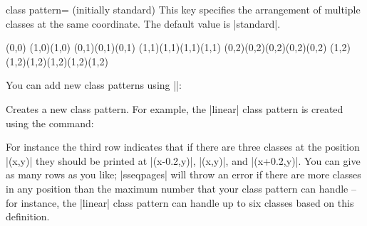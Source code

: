 \documentclass{ltxdoc}
\begin{document}
\begin{sseqdata}[name=ex1,degree={#1}{1-#1}]
\begin{key}{class pattern= (initially standard)}
This key specifies the arrangement of multiple classes at the same coordinate. The default value is |standard|.
\begin{codeexample}[]
\begin{sseqdata}[name=class pattern example,no axes,ymirror]
\class(0,0)
\class(1,0)\class(1,0)
\class(0,1)\class(0,1)\class(0,1)
\class(1,1)\class(1,1)\class(1,1)\class(1,1)
\class(0,2)\class(0,2)\class(0,2)\class(0,2)\class(0,2)
\class(1,2)\class(1,2)\class(1,2)\class(1,2)\class(1,2)\class(1,2)
\end{sseqdata}

\printpage[name=class pattern example, class pattern=standard]
\printpage[name=class pattern example, change classes=blue,
           class pattern=linear, class placement transform={rotate=45}]
\end{codeexample}

You can add new class patterns using |\sseqnewclasspattern|:
\begin{command}{\sseqnewclasspattern{}}
Creates a new class pattern. For example, the |linear| class pattern is created using the command:
\begin{codeexample}
\end{codeexample}
For instance the third row indicates that if there are three classes at the position |(x,y)| they should be printed at |(x-0.2,y)|, |(x,y)|, and |(x+0.2,y)|. You can give as many rows as you like; |sseqpages| will throw an error if there are more classes in any position than the maximum number that your class pattern can handle -- for instance, the |linear| class pattern can handle up to six classes based on this definition.
\end{command}
\end{key}



\end{sseqdata}
\end{document}
